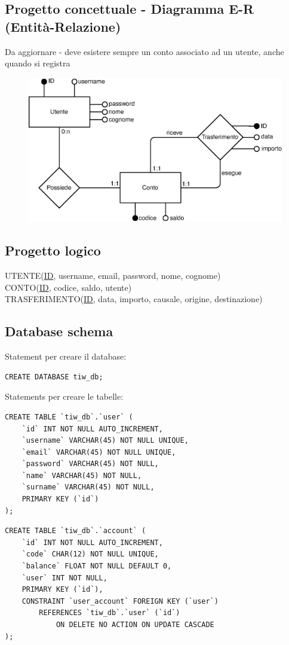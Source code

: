 \documentclass{article}
\begin{document}
\subsection{Progetto concettuale - Diagramma E-R (Entità-Relazione)}
Da aggiornare - deve esistere sempre un conto associato ad un utente, anche quando si registra
\begin{figure}[H]
\centering
\includegraphics[width=1\textwidth]{assets/diagram.eps}
\end{figure}

\subsection{Progetto logico}
UTENTE(\underline{ID}, username, email, password, nome, cognome)
\\
CONTO(\underline{ID}, codice, saldo, utente)
\\
TRASFERIMENTO(\underline{ID}, data, importo, causale, origine, destinazione)

\subsection{Database schema}
Statement per creare il database:
\begin{verbatim}
CREATE DATABASE tiw_db;
\end{verbatim}

Statements per creare le tabelle:
\begin{verbatim}
CREATE TABLE `tiw_db`.`user` (
	`id` INT NOT NULL AUTO_INCREMENT,
	`username` VARCHAR(45) NOT NULL UNIQUE,
	`email` VARCHAR(45) NOT NULL UNIQUE,
	`password` VARCHAR(45) NOT NULL,
	`name` VARCHAR(45) NOT NULL,
	`surname` VARCHAR(45) NOT NULL,
	PRIMARY KEY (`id`)
);
\end{verbatim}
\pagebreak
\begin{verbatim}
CREATE TABLE `tiw_db`.`account` (
	`id` INT NOT NULL AUTO_INCREMENT,
	`code` CHAR(12) NOT NULL UNIQUE,
	`balance` FLOAT NOT NULL DEFAULT 0,
	`user` INT NOT NULL,
	PRIMARY KEY (`id`),
	CONSTRAINT `user_account` FOREIGN KEY (`user`) 
		REFERENCES `tiw_db`.`user` (`id`) 
			ON DELETE NO ACTION ON UPDATE CASCADE
);
\end{verbatim}
\end{document}
